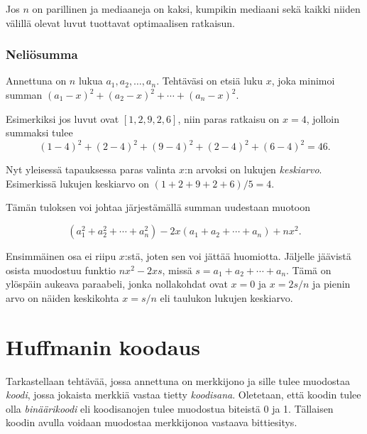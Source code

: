 Jos $n$ on parillinen ja mediaaneja on kaksi,
kumpikin mediaani sekä kaikki niiden välillä
olevat luvut tuottavat optimaalisen ratkaisun.

\subsubsection{Neliösumma}

\begin{task}
Annettuna on $n$ lukua $a_1,a_2,\ldots,a_n$.
Tehtäväsi on etsiä luku $x$, joka minimoi summan
$(a_1-x)^2+(a_2-x)^2+\cdots+(a_n-x)^2.$
\end{task}

Esimerkiksi jos luvut ovat $[1,2,9,2,6]$,
niin paras ratkaisu on $x=4$,
jolloin summaksi tulee
\[
(1-4)^2+(2-4)^2+(9-4)^2+(2-4)^2+(6-4)^2=46.
\]

\noindent
Nyt yleisessä tapauksessa
paras valinta $x$:n arvoksi on lukujen
\textit{keskiarvo}.
Esimerkissä lukujen keskiarvo on $(1+2+9+2+6)/5=4$.

Tämän tuloksen voi johtaa järjestämällä summan
uudestaan muotoon

\[
(a_1^2+a_2^2+\cdots+a_n^2)-2x(a_1+a_2+\cdots+a_n)+nx^2.
\]

Ensimmäinen osa ei riipu $x$:stä, joten sen voi jättää huomiotta.
Jäljelle jäävistä osista muodostuu funktio
$nx^2-2xs$, missä $s=a_1+a_2+\cdots+a_n$.
Tämä on ylöspäin aukeava paraabeli,
jonka nollakohdat ovat $x=0$ ja $x=2s/n$
ja pienin arvo on näiden keskikohta
$x=s/n$ eli taulukon lukujen keskiarvo.

\section{Huffmanin koodaus}


Tarkastellaan tehtävää, jossa annettuna on merkkijono ja
sille tulee muodostaa \textit{koodi},
jossa jokaista merkkiä vastaa tietty \textit{koodisana}.
Oletetaan, että koodin tulee olla \textit{binäärikoodi}
eli koodisanojen tulee muodostua biteistä 0 ja 1.
Tällaisen koodin avulla voidaan muodostaa merkkijonoa
vastaava bittiesitys.

